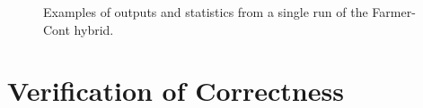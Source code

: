 \documentclass[runningheads]{llncs}
\begin{document}
\begin{figure}[htbp]
\begin{center}
{      \quad
      \quad
      }
    \caption{Examples of outputs and statistics from a single run of the Farmer-Cont hybrid.}
    \label{fig:ContLargeSSim}
  \end{center}
\end{figure}

\section{Verification of Correctness}
\end{document}
